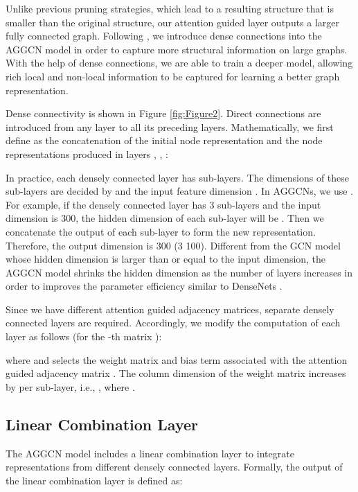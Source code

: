 \documentclass[11pt,a4paper]{article}
\begin{document}
Unlike previous pruning strategies, which lead to a resulting structure that is smaller than the original structure, our attention guided layer outputs a larger fully connected graph. Following \citep{dcgcnforgraph2seq19guo}, we introduce dense connections \citep{Huang2017DenselyCC} into the AGGCN model in order to capture more structural information on large graphs. With the help of dense connections, we are able to train a deeper model, allowing rich local and non-local information to be captured for learning a better graph representation.

Dense connectivity is shown in Figure \ref{fig:Figure2}. Direct connections are introduced from any layer to all its preceding layers. Mathematically, we first define  as the concatenation of the initial node representation and the node representations produced in layers , , :


In practice, each densely connected layer has  sub-layers. The dimensions of these sub-layers  are decided by  and the input feature dimension . In AGGCNs, we use . For example, if the densely connected layer has 3 sub-layers and the input dimension is 300, the hidden dimension of each sub-layer will be . Then we concatenate the output of each sub-layer to form the new representation. Therefore, the output dimension is 300 (3  100). Different from the GCN model whose hidden dimension is larger than or equal to the input dimension, the AGGCN model shrinks the hidden dimension as the number of layers increases in order to improves the parameter efficiency similar to DenseNets \citep{Huang2017DenselyCC}.   

Since we have  different attention guided adjacency matrices,  separate densely connected layers are required. Accordingly, we modify the computation of each layer as follows (for the -th matrix ):

where  and  selects the weight matrix and bias term associated with the attention guided adjacency matrix . The column dimension of the weight matrix increases by  per sub-layer, i.e., , where . 


\subsection{Linear Combination Layer}
\label{ssec:2.4}

The AGGCN model includes a linear combination layer to integrate representations from  different densely connected layers. Formally, the output of the linear combination layer is defined as:
\end{document}
